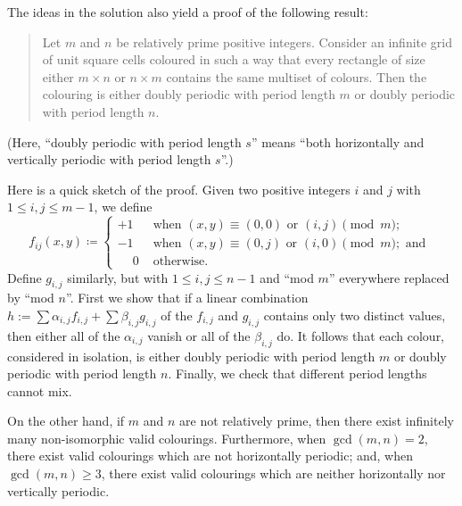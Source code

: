 \begin{remark*}
The ideas in the solution also yield a proof of the following result:
\begin{quote}
Let $m$ and $n$ be relatively prime positive integers.
Consider an infinite grid of unit square cells coloured in
such a way that every rectangle of size either $m \times n$ or $n \times m$
contains the same multiset of colours.
Then the colouring is either doubly periodic with period length $m$
or doubly periodic with period length $n$.
\end{quote}

(Here, ``doubly periodic with period length $s$''
means ``both horizontally and vertically periodic with period length $s$''.)

Here is a quick sketch of the proof. Given two positive integers $i$ and $j$
with $1 \le i, j \le m - 1$, we define
\[
  f_{ij}(x, y) \coloneqq
  \begin{cases}
    +1 & \text{ when } (x, y) \equiv (0, 0) \text{ or } (i, j) \pmod{m}; \\
    -1 & \text{ when } (x, y) \equiv (0, j) \text{ or } (i, 0) \pmod{m};
      \text{ and } \\
    \phantom{+}0 & \text{ otherwise.}
  \end{cases}
\]
Define $g_{i, j}$ similarly, but with $1 \le i, j \le n - 1$ and ``mod $m$''
everywhere replaced by ``mod $n$''. First we show that if a linear combination
$h := \sum \alpha_{i, j}f_{i, j}+\sum\beta_{i, j}g_{i, j}$ of the $f_{i, j}$ and
$g_{i, j}$ contains only two distinct values, then either all of the $\alpha_{i,
j}$ vanish or all of the $\beta_{i, j}$ do. It follows that each colour,
considered in isolation, is either doubly periodic with period length $m$ or
doubly periodic with period length $n$. Finally, we check that different period
lengths cannot mix.

On the other hand, if $m$ and $n$ are not relatively prime,
then there exist infinitely many non-isomorphic valid colourings.
Furthermore, when $\gcd(m, n) = 2$, there exist valid colourings
which are not horizontally periodic; and, when $\gcd(m, n) \ge 3$,
there exist valid colourings which are neither horizontally nor vertically periodic.
\end{remark*}
